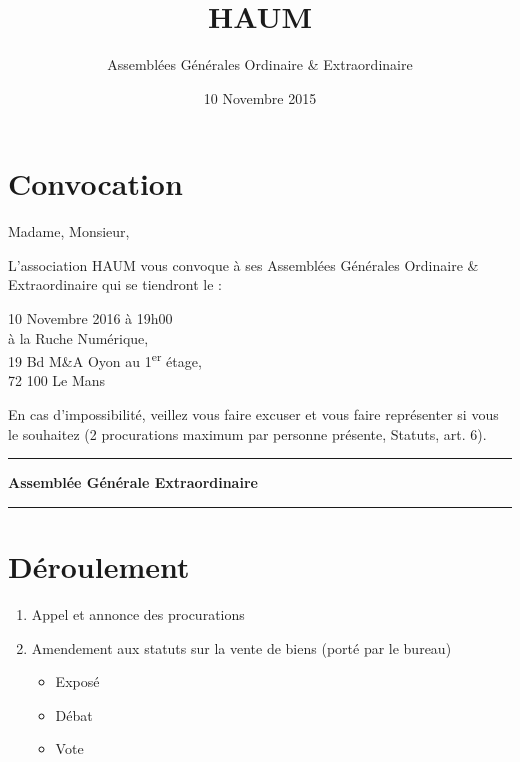 \documentclass[11pt]{article}
\title{HAUM}
\author{Assemblées Générales Ordinaire \& Extraordinaire}
\date{10 Novembre 2015}
\begin{document}
\maketitle


\section*{Convocation}

Madame, Monsieur,

L'association HAUM vous convoque à ses Assemblées Générales Ordinaire \& Extraordinaire qui se tiendront le :

\begin{center}
{\Large 10 Novembre 2016 à 19h00}\\
à la Ruche Numérique,\\19 Bd M\&A Oyon au 1\textsuperscript{er} étage,\\72 100 Le Mans
\end{center}

En cas d'impossibilité, veillez vous faire excuser et vous faire représenter si vous le souhaitez (2 procurations maximum par personne présente, Statuts, art. 6).

\vspace{1.5cm}

\hrule
\vspace{.3cm}
\begin{center}
\Large\bfseries Assemblée Générale Extraordinaire
\end{center}
\vspace{.3cm}
\hrule

\vspace{1.5cm}

\section*{Déroulement}

\begin{enumerate}
    \item Appel et annonce des procurations
    \item Amendement aux statuts sur la vente de biens (porté par le bureau)
    \begin{itemize}
        \item Exposé
        \item Débat
        \item Vote
    \end{itemize}
\end{enumerate}
\end{document}
